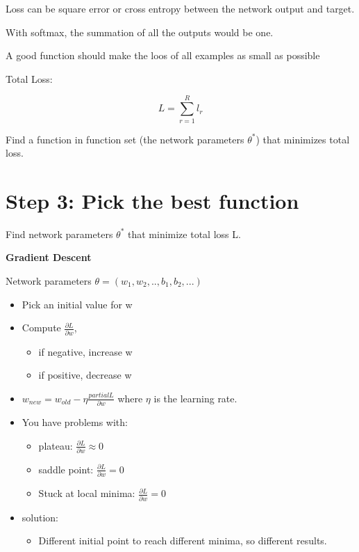 \documentclass[
]{book}
\providecommand{\tightlist}{%
  \setlength{\itemsep}{0pt}\setlength{\parskip}{0pt}}
\begin{document}
Loss can be square error or cross entropy between the network output and target.

With softmax, the summation of all the outputs would be one.

A good function should make the loos of all examples as small as possible

Total Loss:

\[
L = \sum_{r=1}^R l_r
\]

Find a function in function set (the network parameters \(\theta^*\)) that minimizes total loss.

\hypertarget{step-3-pick-the-best-function}{%
\section{Step 3: Pick the best function}\label{step-3-pick-the-best-function}}

Find network parameters \(\theta^*\) that minimize total loss L.

\textbf{Gradient Descent}

Network parameters \(\theta = (w_1,w_2,..,b_1,b_2,...)\)

\begin{itemize}
\item
  Pick an initial value for w
\item
  Compute \(\frac{\partial L}{\partial w}\),

  \begin{itemize}
  \tightlist
  \item
    if negative, increase w
  \item
    if positive, decrease w
  \end{itemize}
\item
  \(w_{new} = w_{old} - \eta \frac{partial L}{\partial w}\) where \(\eta\) is the learning rate.
\item
  You have problems with:

  \begin{itemize}
  \tightlist
  \item
    plateau: \(\frac{\partial L}{\partial w} \approx 0\)
  \item
    saddle point: \(\frac{\partial L}{\partial w} = 0\)
  \item
    Stuck at local minima: \(\frac{\partial L}{\partial w} = 0\)
  \end{itemize}
\item
  solution:

  \begin{itemize}
  \tightlist
  \item
    Different initial point to reach different minima, so different results.
  \end{itemize}
\end{itemize}
\end{document}
